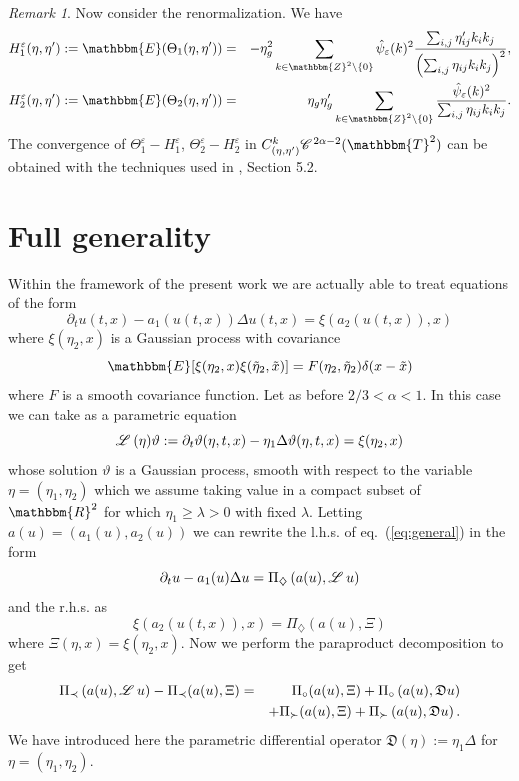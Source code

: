 \documentclass{amsart}
\newcommand{\assign}{:=}
\theoremstyle{remark}
\newtheorem{remark}[theorem]{Remark}
\theoremstyle{definition}
\newcommand{\CC}{\mathscr{C} \hspace{.1em}}
\newcommand{\LL}{\mathscr{L} \hspace{.2em}}
\newcommand{\DF}{\mathfrak{D}}
\begin{document}
\begin{remark}
  Now consider the renormalization. We have
  \begin{eqnarray*}
    H_1^{\varepsilon} (\eta, \eta') \assign \mathbbm{E} (\Theta_1 (\eta,
    \eta')) & = & - \eta_g^2 \sum_{k \in \mathbbm{Z}^2 \backslash \{ 0 \}}
    \hat{\psi}_{\varepsilon} (k)^2 \frac{\sum_{i, j} \eta'_{i j} k_i
    k_j}{\left( \sum_{i, j} \eta_{i j} k_i k_j \right)^2},\\
    H_2^{\varepsilon} (\eta, \eta') \assign \mathbbm{E} (\Theta_2 (\eta,
    \eta')) & = & \eta_g \eta'_g \sum_{k \in \mathbbm{Z}^2 \backslash \{ 0 \}}
    \frac{\hat{\psi}_{\varepsilon} (k)^2}{\sum_{i, j} \eta_{i j} k_i k_j} .
  \end{eqnarray*}
  The convergence of $\Theta_1^{\varepsilon} - H_1^{\varepsilon}$,
  $\Theta_2^{\varepsilon} - H_2^{\varepsilon}$ in $C_{(\eta, \eta')}^k \CC^{2
  \alpha - 2} (\mathbbm{T}^2)$ can be obtained with the techniques used in
  {\cite{gubinelli_paracontrolled_2015}}, Section 5.2. 
\end{remark}

\section{Full generality}\label{sec:fully-generality}

Within the framework of the present work we are actually able to treat
equations of the form
\begin{equation}
  \partial_t u (t, x) - a_1 (u (t, x)) \Delta u (t, x) = \xi (a_2 (u (t, x)),
  x) \label{eq:general}
\end{equation}
where $\xi (\eta_2, x)$ is a Gaussian process with covariance
\[ \mathbbm{E} [\xi (\eta_2, x) \xi (\tilde{\eta}_2, \tilde{x})] = F (\eta_2,
   \tilde{\eta}_2) \delta (x - \tilde{x}) \]
where $F$ is a smooth covariance function. Let as before $2 / 3 < \alpha < 1$.
In this case we can take as a parametric equation
\[ \LL (\eta) \vartheta \assign \partial_t \vartheta (\eta, t, x) - \eta_1
   \Delta \vartheta (\eta, t, x) = \xi (\eta_2, x) \]
whose solution $\vartheta$ is a Gaussian process, smooth with respect to the
variable $\eta = (\eta_1, \eta_2)$ which we assume taking value in a compact
subset of $\mathbbm{R}^2$ for which $\eta_1 \geqslant \lambda > 0$ with fixed
$\lambda$. Letting $a (u) = (a_1 (u), a_2 (u))$ we can rewrite the l.h.s. of
eq.~(\ref{eq:general}) in the form
\[ \partial_t u - a_1 (u) \Delta u = \Pi_{\diamondsuit} \left( a (u), \LL u
   \right) \]
and the r.h.s. as
\[ \xi (a_2 (u (t, x)), x) = \Pi_{\diamondsuit} (a (u), \Xi) \]
where $\Xi (\eta, x) = \xi (\eta_2, x)$. Now we perform the paraproduct
decomposition to get
\begin{eqnarray*}
  \Pi_{\prec} \left( a (u), \LL u \right) - \Pi_{\prec} (a (u), \Xi) & = &
  \Pi_{\circ} (a (u), \Xi) + \Pi_{\circ} \left( a (u), \DF u \right)\\
  &  & + \Pi_{\succ} (a (u), \Xi) + \Pi_{\succ} \left( a (u), \DF u \right) .
\end{eqnarray*}
We have introduced here the parametric differential operator $\DF (\eta)
\assign \eta_1 \Delta$ for $\eta = (\eta_1, \eta_2)$.
\end{document}

